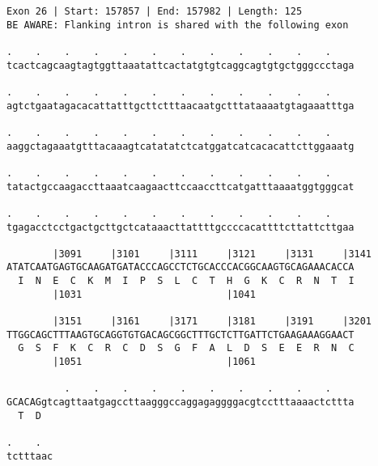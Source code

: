 \documentclass{article}
\begin{document}
\newpage
\begin{Verbatim}
Exon 26 | Start: 157857 | End: 157982 | Length: 125
BE AWARE: Flanking intron is shared with the following exon
 
.    .    .    .    .    .    .    .    .    .    .    .    
tcactcagcaagtagtggttaaatattcactatgtgtcaggcagtgtgctgggccctaga
  
.    .    .    .    .    .    .    .    .    .    .    .    
agtctgaatagacacattatttgcttctttaacaatgctttataaaatgtagaaatttga
  
.    .    .    .    .    .    .    .    .    .    .    .    
aaggctagaaatgtttacaaagtcatatatctcatggatcatcacacattcttggaaatg
  
.    .    .    .    .    .    .    .    .    .    .    .    
tatactgccaagaccttaaatcaagaacttccaaccttcatgatttaaaatggtgggcat
  
.    .    .    .    .    .    .    .    .    .    .    .    
tgagacctcctgactgcttgctcataaacttattttgccccacattttcttattcttgaa
  
        |3091     |3101     |3111     |3121     |3131     |3141
ATATCAATGAGTGCAAGATGATACCCAGCCTCTGCACCCACGGCAAGTGCAGAAACACCA
  I  N  E  C  K  M  I  P  S  L  C  T  H  G  K  C  R  N  T  I
        |1031                         |1041                 
  
        |3151     |3161     |3171     |3181     |3191     |3201
TTGGCAGCTTTAAGTGCAGGTGTGACAGCGGCTTTGCTCTTGATTCTGAAGAAAGGAACT
  G  S  F  K  C  R  C  D  S  G  F  A  L  D  S  E  E  R  N  C
        |1051                         |1061                 
  
          .    .    .    .    .    .    .    .    .    .    
GCACAGgtcagttaatgagccttaagggccaggagaggggacgtcctttaaaactcttta
  T  D                                                      
  
.    .  
tctttaac
\end{Verbatim}
\newpage
\end{document}
